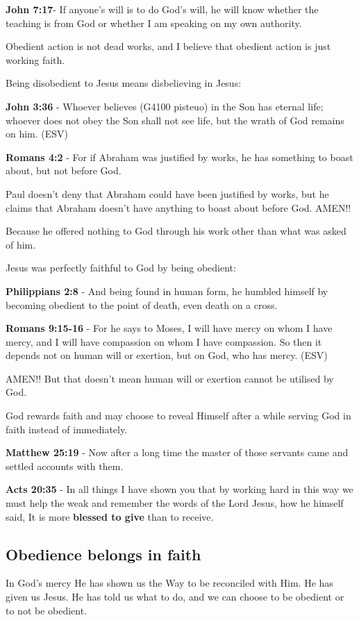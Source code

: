 \documentclass[11pt]{article}
\begin{document}
\textbf{John 7:17}- If anyone's will is to do God's will, he will know whether the teaching is from God or whether I am speaking on my own authority.

Obedient action is not dead works, and I believe that obedient action is just working faith.

Being disobedient to Jesus means disbelieving in Jesus:

\textbf{John 3:36} - Whoever believes (G4100 pisteuo) in the Son has eternal life; whoever does not obey the Son shall not see life, but the wrath of God remains on him. (ESV)

\textbf{Romans 4:2} - For if Abraham was justified by works, he has something to boast about, but not before God.

Paul doesn't deny that Abraham could have been
justified by works, but he claims that Abraham
doesn't have anything to boast about before
God. AMEN!!

Because he offered nothing to God through his work other than what was asked of him.

Jesus was perfectly faithful to God by being obedient:

\textbf{Philippians 2:8} - And being found in human form, he humbled himself by becoming obedient to the point of death, even death on a cross.

\textbf{Romans 9:15-16} - For he says to Moses, I will have mercy on whom I have mercy, and I will have compassion on whom I have compassion. So then it depends not on human will or exertion, but on God, who has mercy. (ESV)

AMEN!! But that doesn't mean human will or exertion cannot be utilised by God.

God rewards faith and may choose to reveal Himself after a while serving God in faith instead of immediately.

\textbf{Matthew 25:19} - Now after a long time the master of those servants came and settled accounts with them.

\textbf{Acts 20:35} - In all things I have shown you that by working hard in this way we must help the weak and remember the words of the Lord Jesus, how he himself said, It is more \textbf{blessed to give} than to receive.

\subsection{Obedience belongs in faith}
\label{sec:org49ac94e}
In God's mercy He has shown us the Way to be reconciled with Him. He has given us Jesus. He has told us what to do, and we can choose to be obedient or to not be obedient.
\end{document}
